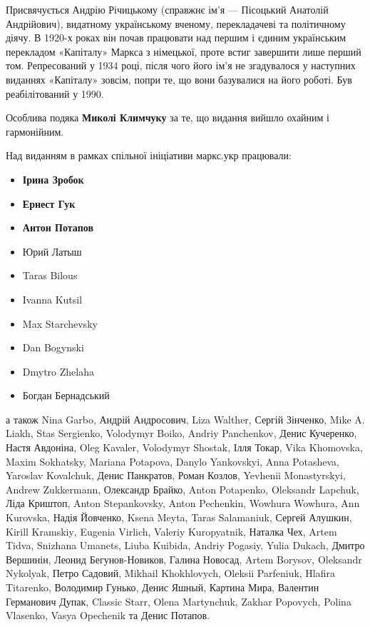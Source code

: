 
Присвячується Андрію Річицькому (справжнє ім'я — Пісоцький Анатолій Андрійович), видатному українському вченому, перекладачеві та політичному діячу. В 1920-х роках він почав працювати над першим і єдиним українським перекладом «Капіталу» Маркса з німецької, проте встиг завершити лише перший том. Репресований у 1934 році, після чого його ім’я не згадувалося у наступних виданнях «Капіталу» зовсім, попри те, що вони базувалися на його роботі. Був реабілітований у 1990. 


\noindent{}Особлива подяка \textbf{Миколі Климчуку} за те,
що видання вийшло охайним і гармонійним. 

\smallskip
\noindent{}Над виданням в рамках спільної ініціативи маркс.укр працювали:
\begin{itemize}[nosep]
\item \textbf{Ірина Зробок}
\item \textbf{Ернест Гук}
\item \textbf{Антон Потапов}
\item Юрий Латыш
\item Taras Bilous
\item Ivanna Kutsil
\item Max Starchevsky
\item Dan Bogynski
\item Dmytro Zhelaha
\item Богдан Бернадський
\end{itemize}
\noindent{}а також Nina Garbo, Андрій Андросович, Liza Walther, Сергій Зінченко,
Mike A. Liakh, Stas Sergienko, Volodymyr Boiko, Andriy Panchenkov, Денис Кучеренко, Настя Авдоніна, Oleg Kavaler, Volodymyr Shostak, Ілля Токар, Vika Khomovska, Maxim Sokhatsky, Mariana Potapova, Danylo Yankovskyi, Anna Potasheva, Yaroslav Kovalchuk, Денис Панкратов, Роман Козлов, \textenglish{Yevhenii Mo\-nas\-tyr\-skyi}, Andrew Zukkermann, Олександр Брайко, Anton Potapenko, Oleksandr Lapchuk, Ліда Криштоп, Anton Stepankovsky, Anton Pechenkin, Wowhura Wowhura, Ann Kurovska, Надія Йовченко, \textenglish{Ksena Meyta, Taras Salamaniuk}, Сергей Алушкин, \textenglish{Kirill Kramskiy}, Eugenia Virlich, Valeriy Kuropyatnik, Наталка Чех, Artem Tidva, Snizhana Umanets, Liuba Kuibida, Andriy Pogasiy, Yulia Dukach, Дмитро Вершинін, Леонид Бегунов-Новиков, Галина Новосад, Artem Borysov, Oleksandr Nykolyak, Петро Садовий, Mikhail Khokhlovych, Oleksii Parfeniuk, Hlafira Titarenko, Володимир Гунько, Денис Яшный, Картина Мира, Валентин Германович Дупак, Classic Starr, Olena Martynchuk, Zakhar Popovych, Polina Vlasenko, Vasya Opechenik та Денис Потапов.



\cleardoublepage